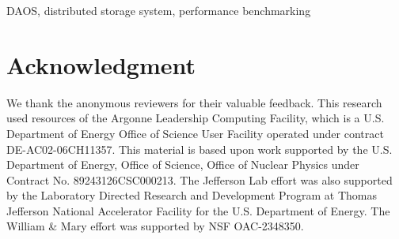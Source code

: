 \documentclass[conference]{IEEEtran}
\begin{document}
\begin{IEEEkeywords}
DAOS, distributed storage system, performance benchmarking
\end{IEEEkeywords}








\section*{Acknowledgment}
We thank the anonymous reviewers for their valuable feedback. This research used resources of the Argonne Leadership Computing Facility, which is a U.S. Department of Energy Office of Science User Facility operated under contract DE-AC02-06CH11357. 
This material is based upon work supported by the U.S. Department of Energy, Office of Science, Office of Nuclear Physics under Contract No. 89243126CSC000213. The Jefferson Lab effort was also supported by the Laboratory Directed Research and Development Program at Thomas Jefferson National Accelerator Facility for the U.S. Department of Energy.
The William \& Mary effort was supported by NSF OAC-2348350.






% 
\end{document}
